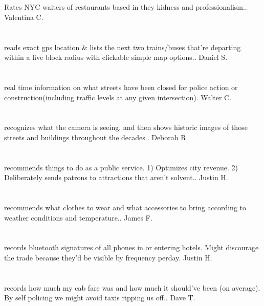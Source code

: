 \section{}Rates NYC waiters of restaurants based in they kidness and professionalism.. Valentina C.
\section{}reads exact gps location \& lists the next two trains/buses that're departing within a five block radius with clickable simple map options.. Daniel S.
\section{}real time information on what streets have been closed for police action or construction(including traffic levels at any given intersection). Walter C.
\section{}recognizes what the camera is seeing,  and then shows historic images of those streets and buildings throughout the decades.. Deborah R.
\section{}recommends things to do as a public service. 1) Optimizes city revenue. 2) Deliberately sends patrons to attractions that aren't solvent.. Justin H.
\section{}recommends what clothes to wear and what accessories to bring according to weather conditions and temperature.. James F.
\section{}records bluetooth signatures of all phones in or entering hotels. Might discourage the trade because they'd be visible by frequency perday. Justin H.
\section{}  records how much my cab fare was and how much it should've been (on average). By self policing we might avoid taxis ripping us off.. Dave T.
